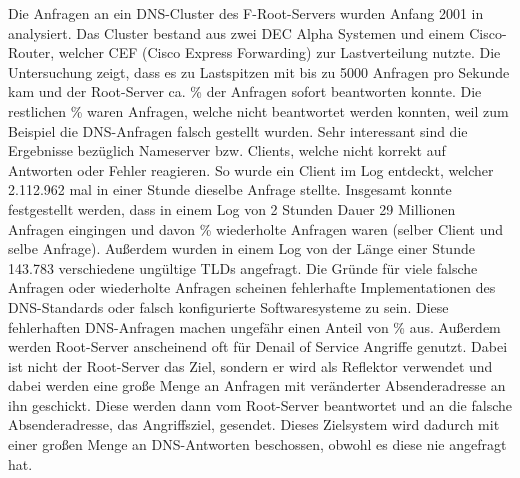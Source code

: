 \documentclass[a4paper, 12pt, BCOR10mm, DIV12, toc=bibliography, toc=listof, german]{scrbook}
\begin{document}
	Die Anfragen an ein DNS-Cluster des F-Root-Servers wurden Anfang 2001 in \cite{brclne2001}
	analysiert. Das Cluster bestand aus zwei DEC Alpha Systemen und einem Cisco-Router, welcher CEF
	(Cisco Express Forwarding) zur Lastverteilung nutzte. Die Untersuchung zeigt, dass es zu
	Lastspitzen mit bis zu 5000 Anfragen pro Sekunde kam und der Root-Server ca. \unit[93]{\%} der
	Anfragen sofort beantworten konnte. Die restlichen \unit[7]{\%} waren Anfragen, welche nicht
	beantwortet werden konnten, weil zum Beispiel die DNS-Anfragen falsch gestellt wurden. Sehr
	interessant sind die Ergebnisse bezüglich Nameserver bzw. Clients, welche nicht korrekt auf
	Antworten oder Fehler reagieren. So wurde ein Client im Log entdeckt, welcher 2.112.962 mal in
	einer Stunde dieselbe Anfrage stellte.  Insgesamt konnte festgestellt werden, dass in einem Log
	von 2 Stunden Dauer 29 Millionen Anfragen eingingen und davon \unit[85]{\%} wiederholte
	Anfragen waren (selber Client und selbe Anfrage). Außerdem wurden in einem Log von der Länge
	einer Stunde 143.783 verschiedene ungültige TLDs angefragt. Die Gründe für viele falsche Anfragen oder
	wiederholte Anfragen scheinen fehlerhafte Implementationen des DNS-Standards \cite{rfc1034,
	rfc1035} oder falsch konfigurierte Softwaresysteme zu sein. Diese fehlerhaften DNS-Anfragen
	machen ungefähr einen Anteil von \unit[14]{\%} aus. Außerdem werden Root-Server
	anscheinend oft für Denail of Service Angriffe genutzt. Dabei ist nicht der Root-Server das
	Ziel, sondern er wird als Reflektor verwendet und dabei werden eine große Menge an Anfragen mit
	veränderter Absenderadresse an ihn geschickt. Diese werden dann vom Root-Server beantwortet
	und an die falsche Absenderadresse, das Angriffsziel, gesendet. Dieses Zielsystem wird dadurch
	mit einer großen Menge an DNS-Antworten beschossen, obwohl es diese nie angefragt hat.
\end{document}
